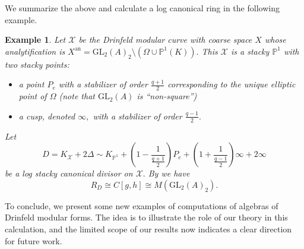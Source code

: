 \documentclass[11pt]{amsart}
\newtheorem{example}[theorem]{Example}
\theoremstyle{definition}
\numberwithin{equation}{section}
\newcommand{\GL}{\mathrm{GL}} 	%
\newcommand{\sX}{\mathscr{X}}		%
\newcommand{\bbP}{\mathbb{P}}		%
\begin{document}

We summarize the above and calculate a log canonical ring in the following example.
\begin{example}
Let $\sX$ be the Drinfeld modular curve with coarse space $X$ whose analytification is $X^{\text{an}}=\GL_2(A)_2\setminus(\Omega\cup\bbP^1(K)).$ This $\sX$ is a stacky $\bbP^1$ with two stacky points: 
\begin{itemize}
	\item a point $P_e$ with a stabilizer of order $\displaystyle{\frac{q+1}{2}}$ corresponding to the unique elliptic point of $\Omega$ (note that $\GL_2(A)$ is ``non-square'')
	\item a cusp, denoted $\infty,$ with a stabilizer of order $\displaystyle{\frac{q-1}{2}}.$
\end{itemize} 

Let \[D=K_{\sX}+2\Delta\sim K_{\bbP^1}+\left(1-\frac{1}{\frac{q+1}{2}} \right)P_e + \left(1+\frac{1}{\frac{q-1}{2}}\right)\infty+2\infty\] be a log stacky canonical divisor on $\sX.$ By \cite[Theorem $6$]{ODorney-canonical-rings-Q-divisors-on-P1} we have \[R_D\cong C[g,h]\cong M(\GL_2(A)_2).\]
\end{example}

To conclude, we present some new examples of computations of algebras of Drinfeld modular forms. The idea is to illustrate the role of our theory in this calculation, and the limited scope of our results now indicates a clear direction for future work.\\     
\end{document}

